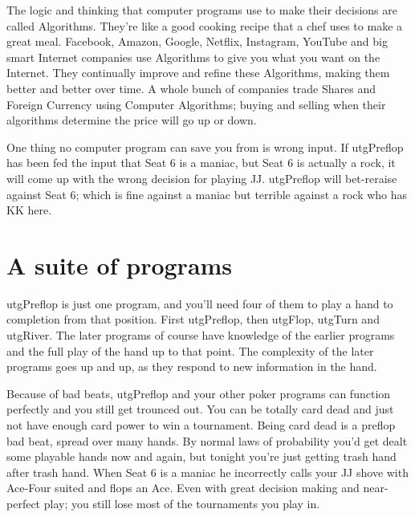 The logic and thinking that computer programs use to
make their decisions are called Algorithms. They're like a good
cooking recipe that a chef uses to make a great meal. Facebook,
Amazon, Google, Netflix, Instagram, YouTube and big smart Internet
companies use Algorithms to give you what you want on the Internet.
They continually improve and refine these Algorithms, making them
better and better over time. A whole bunch of companies trade Shares
and Foreign Currency using Computer Algorithms; buying and selling
when their algorithms determine the price will go up or down.

One thing no computer program can save you from is wrong input.
If utgPreflop has been fed the input that Seat 6 is a maniac,
but Seat 6 is actually a rock, it will come up with the wrong decision
for playing JJ. utgPreflop will bet-reraise against Seat 6; which is
fine against a maniac but terrible against a rock who has KK here.


\section*{A suite of programs}

utgPreflop is just one program, and you'll need four of them to
play a hand to completion from that position. First utgPreflop,
then utgFlop, utgTurn and utgRiver. The later programs of course
have knowledge of the earlier programs and the full play of the hand
up to that point. The complexity of the later programs goes up and up,
as they respond to new information in the hand.

Because of bad beats, utgPreflop and your other poker programs can
function perfectly and you still get trounced out. You can be totally
card dead and just not have enough card power to win a
tournament. Being card dead is a preflop bad beat,
spread over many hands. By normal laws of probability you'd get dealt
some playable hands now and again, but tonight you're just getting
trash hand after trash hand. When Seat 6 is a maniac he incorrectly
calls your JJ shove with Ace-Four suited and flops an Ace. Even with
great decision making and near-perfect play; you still lose most of
the tournaments you play in.

